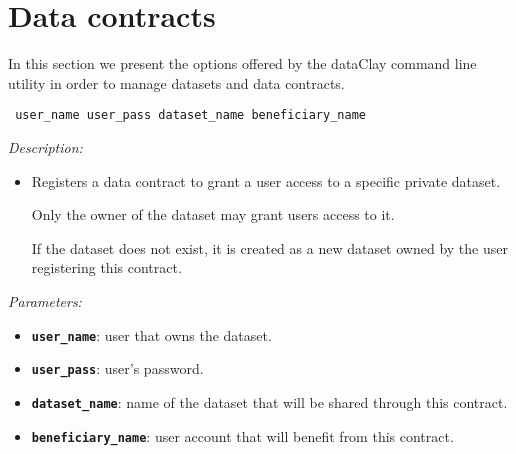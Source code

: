 
\section{Data contracts}

In this section we present the options offered by the dataClay command line utility in order to manage datasets and data contracts.

\begin{dBox}
\texttt{ \newline user\_name user\_pass dataset\_name beneficiary\_name}
\LINE

{\it Description:}

\begin{itemize}
    \item Registers a data contract to grant a user access to a specific private dataset.
    
    Only the owner of the dataset may grant users access to it.
    
    If the dataset does not exist, it is created as a new dataset owned by the user registering this contract.
\end{itemize}

{\it Parameters:}

\begin{itemize}
    \item \texttt{\bfseries user\_name}: user that owns the dataset.
    \item \texttt{\bfseries user\_pass}: user's password.
    \item \texttt{\bfseries dataset\_name}: name of the dataset that will be shared through this contract.
    \item \texttt{\bfseries beneficiary\_name}: user account that will benefit from this contract.
\end{itemize}

\end{dBox}


